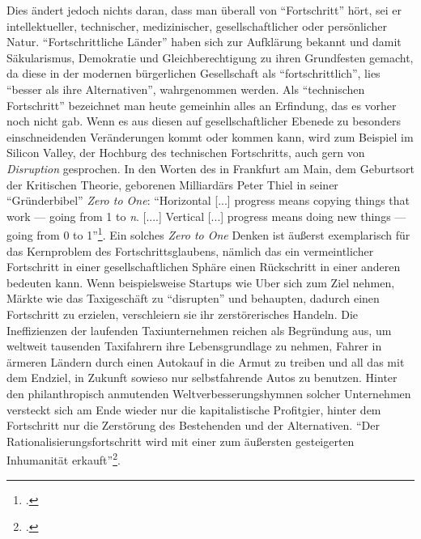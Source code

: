\documentclass[a4paper, 12pt]{article}
\begin{document}
\begin{onehalfspace}
Dies ändert jedoch nichts daran, dass man überall von "`Fortschritt"' hört, sei er intellektueller, technischer, medizinischer, gesellschaftlicher oder persönlicher Natur. "`Fortschrittliche Länder"' haben sich zur Aufklärung bekannt und damit Säkularismus, Demokratie und Gleichberechtigung zu ihren Grundfesten gemacht, da diese in der modernen bürgerlichen Gesellschaft als "`fortschrittlich"', lies "`besser als ihre Alternativen"', wahrgenommen werden. Als "`technischen Fortschritt"' bezeichnet man heute gemeinhin alles an Erfindung, das es vorher noch nicht gab. Wenn es aus diesen auf gesellschaftlicher Ebenede zu besonders einschneidenden Veränderungen kommt oder kommen kann, wird zum Beispiel im Silicon Valley, der Hochburg des technischen Fortschritts, auch gern von \emph{Disruption} gesprochen. In den Worten des in Frankfurt am Main, dem Geburtsort der Kritischen Theorie, geborenen Milliardärs Peter Thiel in seiner "`Gründerbibel"' \emph{Zero to One}: "`Horizontal [...] progress means copying things that work — going from 1 to \emph{n}. [....] Vertical [...] progress means doing new things — going from 0 to 1"'\footnote{\Cite[Siehe][S. XXX]{thiel}.}. Ein solches \emph{Zero to One} Denken ist äußerst exemplarisch für das Kernproblem des Fortschrittsglaubens, nämlich das ein vermeintlicher Fortschritt in einer gesellschaftlichen Sphäre einen Rückschritt in einer anderen bedeuten kann. Wenn beispielsweise Startups wie Uber sich zum Ziel nehmen, Märkte wie das Taxigeschäft zu "`disrupten"' und behaupten, dadurch einen Fortschritt zu erzielen, verschleiern sie ihr zerstörerisches Handeln. Die Ineffizienzen der laufenden Taxiunternehmen reichen als Begründung aus, um weltweit tausenden Taxifahrern ihre Lebensgrundlage zu nehmen, Fahrer in ärmeren Ländern durch einen Autokauf in die Armut zu treiben und all das mit dem Endziel, in Zukunft sowieso nur selbstfahrende Autos zu benutzen. Hinter den philanthropisch anmutenden Weltverbesserungshymnen solcher Unternehmen versteckt sich am Ende wieder nur die kapitalistische Profitgier, hinter dem Fortschritt nur die Zerstörung des Bestehenden und der Alternativen. "`Der Rationalisierungsfortschritt wird mit einer zum äußersten gesteigerten Inhumanität erkauft"'\footnote{\Cite[Siehe][S. 389]{hetzel2011adorno}.}.



\end{onehalfspace}
\end{document}
